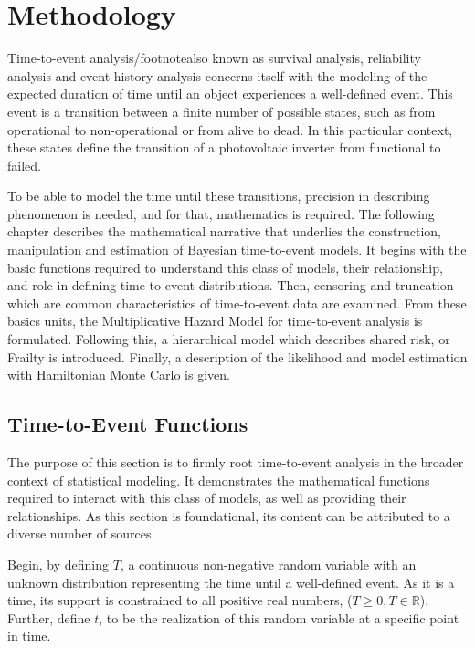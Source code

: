 \chapter*{Methodology}

Time-to-event analysis/footnote{also known as survival analysis, reliability analysis and event history analysis} concerns itself with the modeling of the expected duration of time until an object experiences a well-defined event. This event is a transition between a finite number of possible states, such as from operational to non-operational or from alive to dead\cite{Andersen1992}. In this particular context, these states define the transition of a photovoltaic inverter from functional to failed.

To be able to model the time until these transitions, precision in describing phenomenon is needed, and for that, mathematics is required. The following chapter describes the mathematical narrative that underlies the construction, manipulation and estimation of Bayesian time-to-event models. It begins with the basic functions required to understand this class of models, their relationship, and role in defining time-to-event distributions. Then, censoring and truncation which are common characteristics of time-to-event data are examined. From these basics units, the Multiplicative Hazard Model for time-to-event analysis is formulated. Following this, a hierarchical model which describes shared risk, or Frailty is introduced. Finally, a description of the likelihood and model estimation with Hamiltonian Monte Carlo is given.



\section*{Time-to-Event Functions}

The purpose of this section is to firmly root time-to-event analysis in the broader context of statistical modeling. It demonstrates the mathematical functions required to interact with this class of models, as well as providing their relationships. As this section is foundational, its content can be attributed to a diverse number of sources\cite{Aalen2008}\cite{Tableman2004}\cite{Klein2003}\cite{Kleinbaum2005}\cite{Cleves2008}\cite{Rodriguez2007}.

Begin, by defining $T$, a continuous non-negative random variable with an unknown distribution representing the time until a well-defined event. As it is a time, its support is constrained to all positive real numbers, ($T \ge 0, T \in \mathbb{R}$). Further, define $t$, to be the realization of this random variable at a specific point in time.

